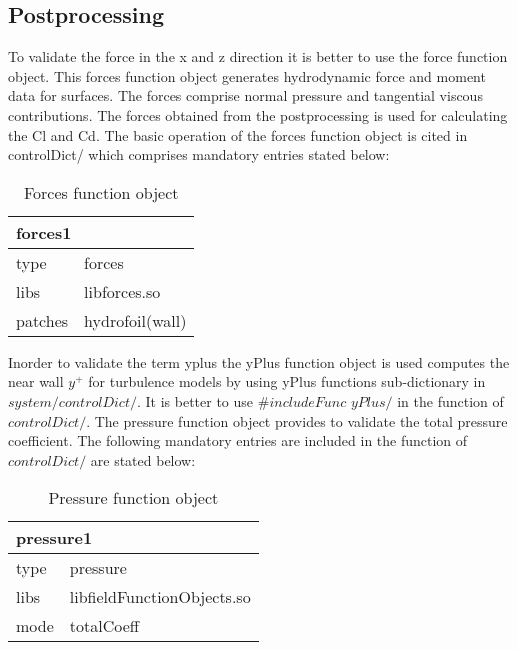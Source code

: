 \subsection{Postprocessing}
To validate the force in the x and z direction it is better to use the force function object. This forces function
object generates hydrodynamic force and moment data for surfaces. The forces comprise normal pressure
and tangential viscous contributions. The forces obtained from the postprocessing is used for calculating the
Cl and Cd. The basic operation of the forces function object is cited in controlDict/ which comprises
mandatory entries stated below:\\
\begin{table}[h]
\centering
\begin{tabular}{|ll|}
\hline
\multicolumn{2}{|l|}{forces1}    \\ \hline
\multicolumn{1}{|l|}{type } &forces  \\ \hline
\multicolumn{1}{|l|}{libs} & libforces.so  \\ \hline
\multicolumn{1}{|l|}{patches} & hydrofoil(wall) \\ \hline
\end{tabular}
\caption{Forces function object}
\label{tab:PC}
\end{table}




Inorder to validate the term yplus the yPlus function object is used computes the near wall $y^+$ for turbulence models
by using yPlus functions sub-dictionary in $\textit{system/controlDict}/$. It is better to use ${\#includeFunc}$ $yPlus/$ 
in the function of $\textit{controlDict}/$.
The pressure function object provides to validate the total pressure coefficient. The following  mandatory entries are 
included in the function of $\textit{controlDict}/$ are stated below: 
 \begin{table}[h]
\centering
\begin{tabular}{|ll|}
\hline
\multicolumn{2}{|l|}{pressure1}    \\ \hline
\multicolumn{1}{|l|}{type } &pressure  \\ \hline
\multicolumn{1}{|l|}{libs} & libfieldFunctionObjects.so  \\ \hline
\multicolumn{1}{|l|}{mode} & totalCoeff \\ \hline
\end{tabular}
\caption{Pressure function object}
\label{tab:PC}
\end{table}

















